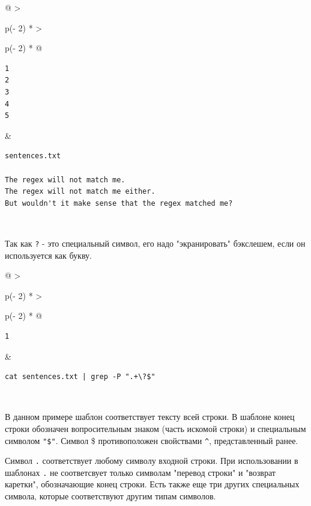 \documentclass{article}
\begin{document}
\begin{longtable}[]{@{}
  >{\raggedright\arraybackslash}p{(\columnwidth - 2\tabcolsep) * }
  >{\raggedright\arraybackslash}p{(\columnwidth - 2\tabcolsep) * }@{}}
\toprule
\endhead
\begin{minipage}[t]{\linewidth}\raggedright
\begin{verbatim}
1
2
3
4
5
\end{verbatim}
\end{minipage} & \begin{minipage}[t]{\linewidth}\raggedright
\begin{verbatim}
sentences.txt

The regex will not match me.
The regex will not match me either.
But wouldn't it make sense that the regex matched me?
\end{verbatim}
\end{minipage} \\ \addlinespace
\bottomrule
\end{longtable}

Так как \texttt{?} - это специальный символ, его надо "экранировать"
бэкслешем, если он используется как букву.

\begin{longtable}[]{@{}
  >{\raggedright\arraybackslash}p{(\columnwidth - 2\tabcolsep) * }
  >{\raggedright\arraybackslash}p{(\columnwidth - 2\tabcolsep) * }@{}}
\toprule
\endhead
\begin{minipage}[t]{\linewidth}\raggedright
\begin{verbatim}
1
\end{verbatim}
\end{minipage} & \begin{minipage}[t]{\linewidth}\raggedright
\begin{verbatim}
cat sentences.txt | grep -P ".+\?$"
\end{verbatim}
\end{minipage} \\ \addlinespace
\bottomrule
\end{longtable}

В данном примере шаблон соответствует тексту всей строки. В шаблоне
конец строки обозначен вопросительным знаком (часть искомой строки) и
специальным символом \texttt{"\$"}. Символ \$ противоположен свойствами
\texttt{\^{}}, представленный ранее.

Символ \texttt{.} соответствует любому символу входной строки. При
использовании в шаблонах \texttt{.} не соответсвует только символам
"перевод строки" и "возврат каретки", обозначающие конец строки. Есть
также еще три других специальных символа, которые соответствуют другим
типам символов.
\end{document}
